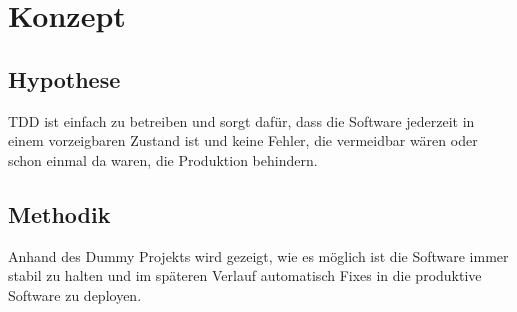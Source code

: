 \section{Konzept}
\subsection{Hypothese}
TDD ist einfach zu betreiben und sorgt dafür, dass die Software jederzeit in einem
vorzeigbaren Zustand ist und keine Fehler, die vermeidbar wären oder schon einmal da waren, die Produktion behindern.

\subsection{Methodik}
Anhand des Dummy Projekts wird gezeigt, wie es möglich ist die Software immer stabil zu
halten und im späteren Verlauf automatisch Fixes in die produktive Software zu deployen.